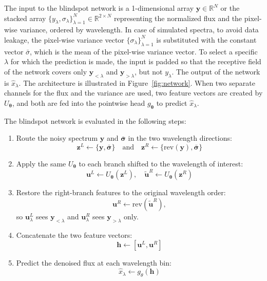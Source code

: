 \documentclass[twocolumn]{aastex7}
\newcommand{\m}[1]{\boldsymbol{#1}}
\begin{document}
The input to the blindspot network is a 1-dimensional array $\m{y}\in\mathbb{R}^{N}$ or the stacked array $\{y_\lambda, \sigma_\lambda\}_{\lambda=1}^{N} \in\mathbb{R}^{2 \times N}$ representing the normalized flux and the pixel-wise variance, ordered by wavelength. In case of simulated spectra, to avoid data leakage, the pixel-wise variance vector $\{\sigma_\lambda\}_{\lambda=1}^{N}$ is substituted with the constant vector $\bar{\sigma}$, which is the mean of the pixel-wise variance vector. To select a specific $\lambda$ for which the prediction is made, the input is padded so that the receptive field of the network covers only $\m{y}_{<\lambda}$ and $\m{y}_{>\lambda}$, but not $y_{\lambda}$. The output of the network is $\hat{x}_\lambda$. The architecture is illustrated in Figure~\ref{fig:network}. When two separate channels for the flux and the variance are used, two feature vectors are created by $U_{\m{\theta}}$, and both are fed into the pointwise head $g_{\m{\theta}}$ to predict $\hat{x}_{\lambda}$.

The blindspot network is evaluated in the following steps:
\begin{enumerate}
    \item Route the noisy spectrum $\m{y}$ and $\bar{\m{\sigma}}$ in the two wavelength directions:
        \begin{equation*}
            \m{z}^{L}\leftarrow \{\m{y}, \bar{\m{\sigma}}\}
            \quad \text{and} \quad
            \m{z}^{R}\leftarrow \{\mathrm{rev}(\m{y}), \bar{\m{\sigma}}\}
        \end{equation*}
    \item Apply the same $U_{\m{\theta}}$ to each branch shifted to the wavelength of interest:
        \begin{equation*}
            \m{u}^{L}\leftarrow U_{\m{\theta}}(\m{z}^{L}),
            \quad
            \tilde{\m{u}}^{R}\leftarrow U_{\m{\theta}}(\m{z}^{R})
        \end{equation*}
    \item Restore the right-branch features to the original wavelength order:
        \begin{equation*}
            \m{u}^{R}\leftarrow\mathrm{rev}(\tilde{\m{u}}^{R}),
        \end{equation*}
        so $\m{u}^{L}_{\lambda}$ sees $\m{y}_{<\lambda}$ and $\m{u}^{R}_{\lambda}$ sees $\m{y}_{>\lambda}$ only.
    \item Concatenate the two feature vectors:
        \begin{equation*}
            \m{h} \leftarrow [\m{u}^{L},\m{u}^{R}]
        \end{equation*}
    \item Predict the denoised flux at each wavelength bin:
        \begin{equation*}
            \hat{x}_{\lambda}\leftarrow g_{\theta}(\m{h})
        \end{equation*}
\end{enumerate}
\end{document}
